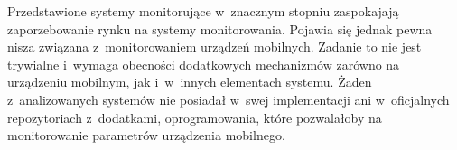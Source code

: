 Przedstawione systemy monitorujące w~znacznym stopniu zaspokajają
zaporzebowanie rynku na systemy monitorowania. Pojawia się jednak
pewna nisza związana z~monitorowaniem urządzeń mobilnych. Zadanie to
nie jest trywialne i~wymaga obecności dodatkowych mechanizmów zarówno
na urządzeniu mobilnym, jak i~w~innych elementach systemu. Żaden
z~analizowanych systemów nie posiadał w~swej implementacji ani
w~oficjalnych repozytoriach z~dodatkami, oprogramowania, które
pozwalałoby na monitorowanie parametrów urządzenia mobilnego.

